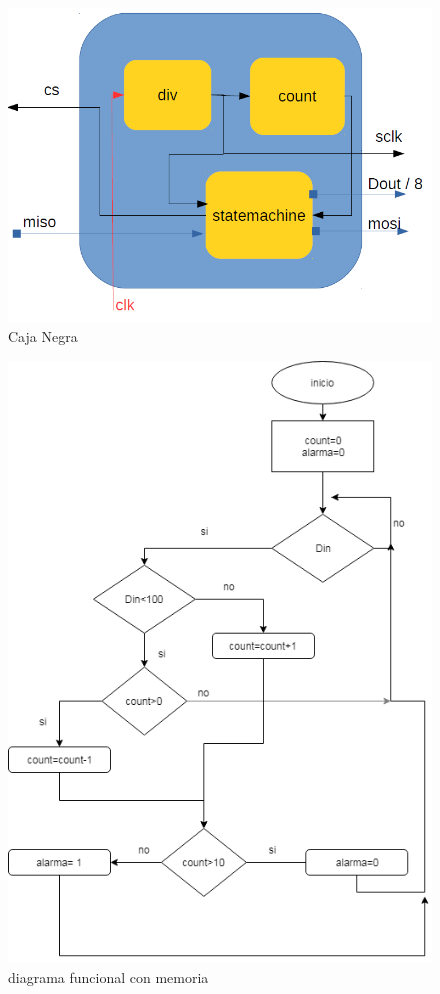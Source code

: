 \documentclass{article}
\begin{document}
\begin{figure}[H]
\centering
\includegraphics[scale=0.5]{d2.PNG}
\caption{Caja Negra}
\label{imagen 1}
\end{figure}


\begin{figure}[H]
\centering
\includegraphics[scale=0.5]{D.png}
\caption{diagrama funcional con memoria}
\label{imagen 1}
\end{figure}
\end{document}
